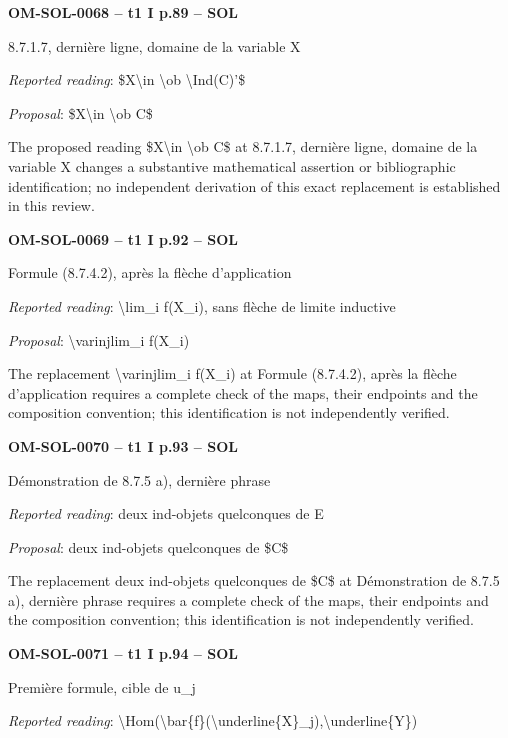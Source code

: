 \par\noindent\textbf{OM-SOL-0068 -- t1 I p.89 -- SOL}\par
8.7.1.7, dernière ligne, domaine de la variable X\par
\emph{Reported reading}: \$X\textbackslash{}in \textbackslash{}ob \textbackslash{}Ind(C)'\$\par
\emph{Proposal}: \$X\textbackslash{}in \textbackslash{}ob C\$\par
The proposed reading \$X\textbackslash{}in \textbackslash{}ob C\$ at 8.7.1.7, dernière ligne, domaine de la variable X changes a substantive mathematical assertion or bibliographic identification; no independent derivation of this exact replacement is established in this review.\par
\par\noindent\textbf{OM-SOL-0069 -- t1 I p.92 -- SOL}\par
Formule (8.7.4.2), après la flèche d'application\par
\emph{Reported reading}: \textbackslash{}lim\_i f(X\_i), sans flèche de limite inductive\par
\emph{Proposal}: \textbackslash{}varinjlim\_i f(X\_i)\par
The replacement \textbackslash{}varinjlim\_i f(X\_i) at Formule (8.7.4.2), après la flèche d'application requires a complete check of the maps, their endpoints and the composition convention; this identification is not independently verified.\par
\par\noindent\textbf{OM-SOL-0070 -- t1 I p.93 -- SOL}\par
Démonstration de 8.7.5 a), dernière phrase\par
\emph{Reported reading}: deux ind-objets quelconques de E\par
\emph{Proposal}: deux ind-objets quelconques de \$C\$\par
The replacement deux ind-objets quelconques de \$C\$ at Démonstration de 8.7.5 a), dernière phrase requires a complete check of the maps, their endpoints and the composition convention; this identification is not independently verified.\par
\par\noindent\textbf{OM-SOL-0071 -- t1 I p.94 -- SOL}\par
Première formule, cible de u\_j\par
\emph{Reported reading}: \textbackslash{}Hom(\textbackslash{}bar\{f\}(\textbackslash{}underline\{X\}\_j),\textbackslash{}underline\{Y\})\par
